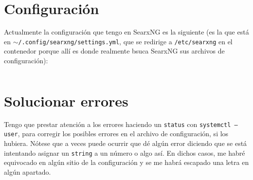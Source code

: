 \documentclass{article}
\begin{document}
    \section{Configuración}
    Actualmente la configuración que tengo en SearxNG es la siguiente (es la
    que está en \texttt{$\sim$/.config/searxng/settings.yml}, que se redirige
    a \texttt{/etc/searxng} en el contenedor porque allí es donde realmente
    bsuca SearxNG sus archivos de configuración):

    \inputminted[breaklines, breakanywhere, breaksymbolleft="", breaksymbolright="", breakanywheresymbolpre="", breakanywheresymbolpost=""]
    {yaml}{inc/settings.yml}

    \section{Solucionar errores}
    Tengo que prestar atención a los errores haciendo un \texttt{status} con
    \texttt{systemctl --user}, para corregir los posibles errores en el archivo
    de configuración, si los hubiera. Nótese que a veces puede ocurrir que
    dé algún error diciendo que se está intentando asignar un \texttt{string} a
    un número o algo así. En dichos casos, me habré equivocado en algún sitio
    de la configuración y se me habrá escapado una letra en algún apartado.
\end{document}
